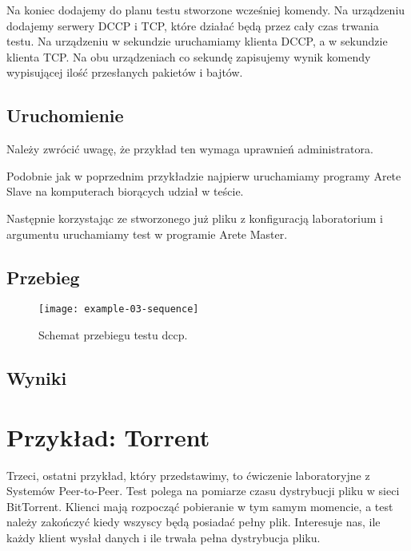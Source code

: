 \documentclass[00-praca-magisterska.tex]{subfiles}
\begin{document}
Na koniec dodajemy do planu testu stworzone wcześniej komendy. Na urządzeniu
 dodajemy serwery DCCP i TCP, które działać będą przez cały czas
trwania testu. Na urządzeniu  w  sekundzie uruchamiamy
klienta DCCP, a w  sekundzie klienta TCP. Na obu urządzeniach co
sekundę zapisujemy wynik komendy wypisującej ilość przesłanych pakietów i
bajtów.

\subsection{Uruchomienie}

Należy zwrócić uwagę, że przykład ten wymaga uprawnień administratora.

Podobnie jak w poprzednim przykładzie najpierw uruchamiamy programy Arete Slave
na komputerach biorących udział w teście.


Następnie korzystając ze stworzonego już pliku z konfiguracją laboratorium i
argumentu  uruchamiamy test w programie Arete Master.


\subsection{Przebieg}


\begin{figure}[htb]
\begin{center}
\leavevmode
\texttt{[image: example-03-sequence]}
\end{center}
\caption{Schemat przebiegu testu dccp.}
\label{fig:example-03-sequence}
\end{figure}

\subsection{Wyniki}


\section{Przykład: Torrent}

Trzeci, ostatni przykład, który przedstawimy, to ćwiczenie laboratoryjne z
Systemów Peer-to-Peer. Test polega na pomiarze czasu dystrybucji pliku w sieci
BitTorrent. Klienci mają rozpocząć pobieranie w tym samym momencie, a test należy
zakończyć kiedy wszyscy będą posiadać pełny plik. Interesuje nas, ile każdy
klient wysłał danych i ile trwała pełna dystrybucja pliku.
\end{document}
